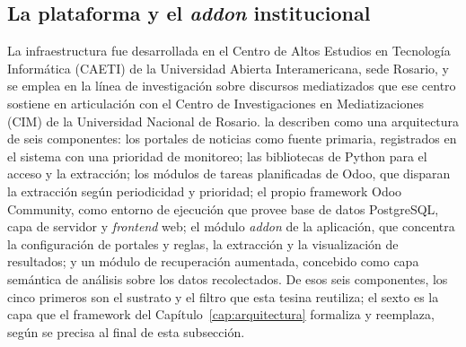 \documentclass[12pt]{report}
\begin{document}
\subsection{La plataforma y el \textit{addon} institucional}
\label{sec:impl-pre-sustrato}

La infraestructura fue desarrollada en el Centro de Altos Estudios en Tecnología Informática (CAETI) de la Universidad Abierta Interamericana, sede Rosario, y se emplea en la línea de investigación sobre discursos mediatizados que ese centro sostiene en articulación con el Centro de Investigaciones en Mediatizaciones (CIM) de la Universidad Nacional de Rosario. \citet{raimondo:2024} la describen como una arquitectura de seis componentes: los portales de noticias como fuente primaria, registrados en el sistema con una prioridad de monitoreo; las bibliotecas de Python para el acceso y la extracción; los módulos de tareas planificadas de Odoo, que disparan la extracción según periodicidad y prioridad; el propio framework Odoo Community, como entorno de ejecución que provee base de datos PostgreSQL, capa de servidor y \textit{frontend} web; el módulo \textit{addon} de la aplicación, que concentra la configuración de portales y reglas, la extracción y la visualización de resultados; y un módulo de recuperación aumentada, concebido como capa semántica de análisis sobre los datos recolectados. De esos seis componentes, los cinco primeros son el sustrato y el filtro que esta tesina reutiliza; el sexto es la capa que el framework del Capítulo~\ref{cap:arquitectura} formaliza y reemplaza, según se precisa al final de esta subsección.
\end{document}
